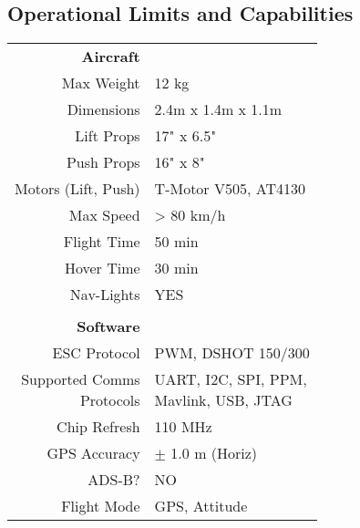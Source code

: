 \subsection{Operational Limits and Capabilities}
\label{sec:limits-and-capabilities}

{
\renewcommand{\arraystretch}{2.0}
\begin{table}[H]
\parbox[t][][t]{.45\linewidth}{
\centering
\begin{tabular}{r|l}
\color{hyperrideblue} \textbf{Aircraft} & \textbf{} \\
Max Weight & 12 kg \\
Dimensions & 2.4m x 1.4m x 1.1m \\
Lift Props & 17" x 6.5" \\
Push Props & 16" x 8" \\
Motors (Lift, Push) & T-Motor V505, AT4130 \\
Max Speed & > 80 km/h \\
Flight Time & 50 min \\
Hover Time & 30 min \\
Nav-Lights & YES \\
\multicolumn{1}{l|}{} &  \\
\color{hyperrideblue} \textbf{Software} &  \\
ESC Protocol & PWM, DSHOT 150/300 \\
\Longunderstack[r]{Supported Comms\\Protocols} & \Longunderstack[l]{UART, I2C, SPI, PPM,\\Mavlink, USB, JTAG} \\
Chip Refresh & 110 MHz \\
GPS Accuracy & $\pm$ 1.0 m (Horiz) \\
ADS-B? & NO \\
Flight Mode & GPS, Attitude \\


\end{tabular}}
\end{table}}
